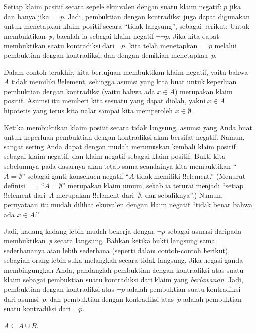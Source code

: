 \documentclass[../../../include/open-logic-section]{subfiles}
\begin{document}
Setiap klaim positif secara sepele ekuivalen dengan suatu klaim
negatif: $p$ jika dan hanya jika $\lnot\lnot p$. Jadi, pembuktian
dengan kontradiksi juga dapat digunakan untuk menetapkan klaim positif
secara ``tidak langsung'', sebagai berikut: Untuk membuktikan~$p$,
bacalah ia sebagai klaim negatif $\lnot\lnot p$. Jika kita dapat
membuktikan suatu kontradiksi dari $\lnot p$, kita telah menetapkan
$\lnot\lnot p$ melalui pembuktian dengan kontradiksi, dan dengan
demikian menetapkan~$p$.

Dalam contoh terakhir, kita bertujuan membuktikan klaim negatif, yaitu
bahwa $A$ tidak memiliki !!{element}, sehingga asumsi yang kita buat
untuk keperluan pembuktian dengan kontradiksi (yaitu bahwa ada $x \in
A$) merupakan klaim positif. Asumsi itu memberi kita sesuatu yang
dapat diolah, yakni $x \in A$ hipotetis yang terus kita nalar sampai
kita memperoleh $x \in \emptyset$.

Ketika membuktikan klaim positif secara tidak langsung, asumsi yang
Anda buat untuk keperluan pembuktian dengan kontradiksi akan bersifat
negatif. Namun, sangat sering Anda dapat dengan mudah merumuskan
kembali klaim positif sebagai klaim negatif, dan klaim negatif sebagai
klaim positif. Bukti kita sebelumnya pada dasarnya akan tetap sama
seandainya kita membuktikan ``$A = \emptyset$'' sebagai ganti
konsekuen negatif ``$A$ tidak memiliki !!{element}.'' (Menurut definisi
$=$, ``$A = \emptyset$'' merupakan klaim umum, sebab ia terurai menjadi
``setiap !!{element} dari~$A$ merupakan !!{element} dari~$\emptyset$,
dan sebaliknya''.) Namun, pernyataan itu mudah dilihat ekuivalen dengan
klaim negatif ``tidak benar bahwa ada $x \in A$.''

Jadi, kadang-kadang lebih mudah bekerja dengan $\lnot p$ sebagai
asumsi daripada membuktikan~$p$ secara langsung. Bahkan ketika bukti
langsung sama sederhananya atau lebih sederhana (seperti dalam
contoh-contoh berikut), sebagian orang lebih suka melangkah secara
tidak langsung. Jika negasi ganda membingungkan Anda, pandanglah
pembuktian dengan kontradiksi atas suatu klaim sebagai pembuktian suatu
kontradiksi dari klaim yang \emph{berlawanan}. Jadi, pembuktian dengan
kontradiksi atas $\lnot p$ adalah pembuktian suatu kontradiksi dari
asumsi~$p$; dan pembuktian dengan kontradiksi atas~$p$ adalah
pembuktian suatu kontradiksi dari~$\lnot p$.

\begin{prop}
$A \subseteq A \cup B$.
\end{prop}
\end{document}
